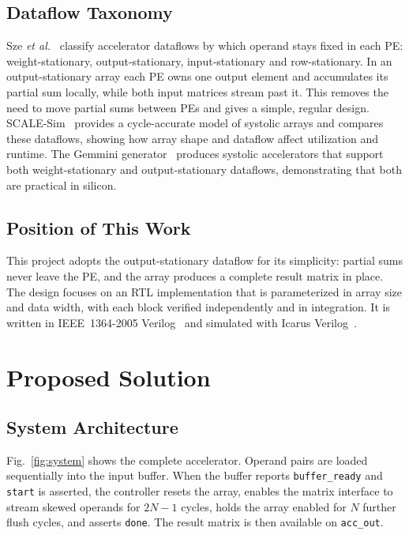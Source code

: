 \documentclass[conference]{IEEEtran}
\begin{document}
\subsection{Dataflow Taxonomy}
Sze \emph{et al.}~\cite{sze2017} classify accelerator dataflows by which operand stays fixed
in each PE: weight-stationary, output-stationary, input-stationary and row-stationary.
In an output-stationary array each PE owns one output element and accumulates its partial
sum locally, while both input matrices stream past it. This removes the need to move partial
sums between PEs and gives a simple, regular design. SCALE-Sim~\cite{samajdar2018} provides
a cycle-accurate model of systolic arrays and compares these dataflows, showing how array
shape and dataflow affect utilization and runtime. The Gemmini generator~\cite{genc2021}
produces systolic accelerators that support both weight-stationary and output-stationary
dataflows, demonstrating that both are practical in silicon.

\subsection{Position of This Work}
This project adopts the output-stationary dataflow for its simplicity: partial sums never
leave the PE, and the array produces a complete result matrix in place. The design focuses on
an RTL implementation that is parameterized in array size and data width, with each block
verified independently and in integration. It is written in IEEE~1364-2005
Verilog~\cite{ieee1364} and simulated with Icarus Verilog~\cite{icarus}.

\section{Proposed Solution}
\subsection{System Architecture}
Fig.~\ref{fig:system} shows the complete accelerator. Operand pairs are loaded sequentially
into the input buffer. When the buffer reports \texttt{buffer\_ready} and \texttt{start} is
asserted, the controller resets the array, enables the matrix interface to stream skewed
operands for $2N-1$ cycles, holds the array enabled for $N$ further flush cycles, and asserts
\texttt{done}. The result matrix is then available on \texttt{acc\_out}.
\end{document}
